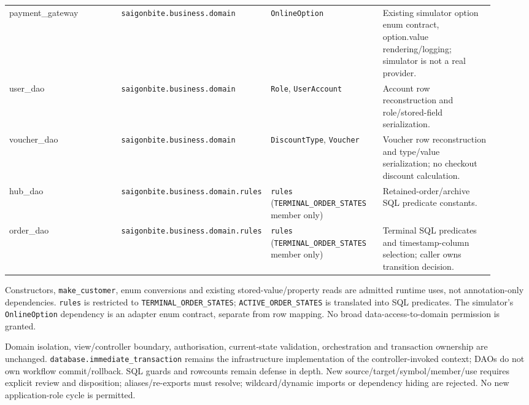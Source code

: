 \begin{longtable}{>{\raggedright\arraybackslash}p{0.2300\linewidth}>{\raggedright\arraybackslash}p{0.2300\linewidth}>{\raggedright\arraybackslash}p{0.2300\linewidth}>{\raggedright\arraybackslash}p{0.2300\linewidth}}
payment\_gateway & \texttt{saigonbite.\allowbreak{}business.\allowbreak{}domain} & \texttt{OnlineOption} & Existing simulator option enum contract, option.value rendering/logging; simulator is not a real provider. \\
user\_dao & \texttt{saigonbite.\allowbreak{}business.\allowbreak{}domain} & \texttt{Role}, \texttt{UserAccount} & Account row reconstruction and role/stored-field serialization. \\
voucher\_dao & \texttt{saigonbite.\allowbreak{}business.\allowbreak{}domain} & \texttt{DiscountType}, \texttt{Voucher} & Voucher row reconstruction and type/value serialization; no checkout discount calculation. \\
hub\_dao & \texttt{saigonbite.\allowbreak{}business.\allowbreak{}domain.\allowbreak{}rules} & \texttt{rules} (\texttt{TERMINAL\_\allowbreak{}ORDER\_\allowbreak{}STATES} member only) & Retained-order/archive SQL predicate constants. \\
order\_dao & \texttt{saigonbite.\allowbreak{}business.\allowbreak{}domain.\allowbreak{}rules} & \texttt{rules} (\texttt{TERMINAL\_\allowbreak{}ORDER\_\allowbreak{}STATES} member only) & Terminal SQL predicates and timestamp-column selection; caller owns transition decision. \\
\end{longtable}
Constructors, \texttt{make\_\allowbreak{}customer}, enum conversions and existing stored-value/property reads are admitted runtime uses, not annotation-only dependencies. \texttt{rules} is restricted to \texttt{TERMINAL\_\allowbreak{}ORDER\_\allowbreak{}STATES}; \texttt{ACTIVE\_\allowbreak{}ORDER\_\allowbreak{}STATES} is translated into SQL predicates. The simulator's \texttt{OnlineOption} dependency is an adapter enum contract, separate from row mapping. No broad data-access-to-domain permission is granted.

Domain isolation, view/controller boundary, authorisation, current-state validation, orchestration and transaction ownership are unchanged. \texttt{database.\allowbreak{}immediate\_\allowbreak{}transaction} remains the infrastructure implementation of the controller-invoked context; DAOs do not own workflow commit/rollback. SQL guards and rowcounts remain defense in depth. New source/target/symbol/member/use requires explicit review and disposition; aliases/re-exports must resolve; wildcard/dynamic imports or dependency hiding are rejected. No new application-role cycle is permitted.

